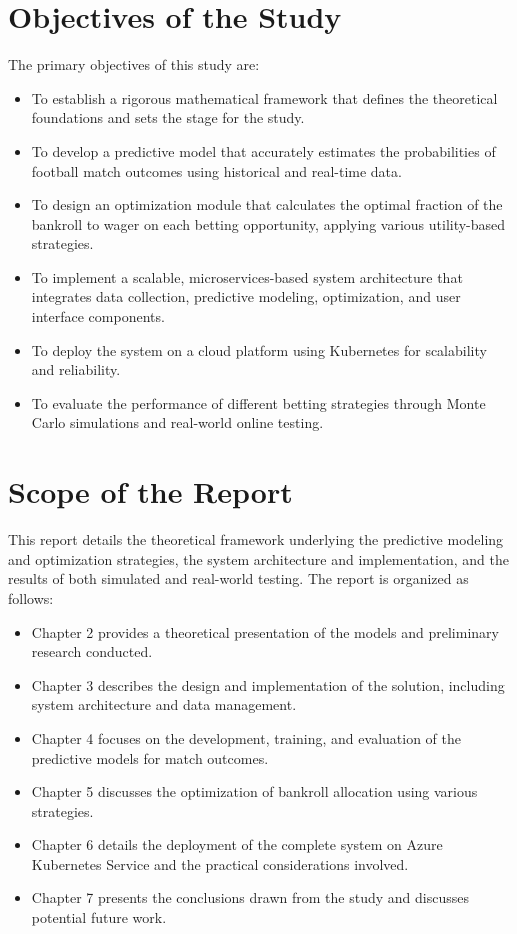 \documentclass[10pt]{report}
\begin{document}
\section{Objectives of the Study}

The primary objectives of this study are:

\begin{itemize}
\item To establish a rigorous mathematical framework that defines the theoretical foundations and sets the stage for the study.
\item To develop a predictive model that accurately estimates the probabilities of football match outcomes using historical and real-time data. \item To design an optimization module that calculates the optimal fraction of the bankroll to wager on each betting opportunity, applying various utility-based strategies. \item To implement a scalable, microservices-based system architecture that integrates data collection, predictive modeling, optimization, and user interface components. \item To deploy the system on a cloud platform using Kubernetes for scalability and reliability. \item To evaluate the performance of different betting strategies through Monte Carlo simulations and real-world online testing. \end{itemize}

\section{Scope of the Report}

This report details the theoretical framework underlying the predictive modeling and optimization strategies, the system architecture and implementation, and the results of both simulated and real-world testing. The report is organized as follows:

\begin{itemize} \item Chapter 2 provides a theoretical presentation of the models and preliminary research conducted. \item Chapter 3 describes the design and implementation of the solution, including system architecture and data management. \item Chapter 4 focuses on the development, training, and evaluation of the predictive models for match outcomes. \item Chapter 5 discusses the optimization of bankroll allocation using various strategies. \item Chapter 6 details the deployment of the complete system on Azure Kubernetes Service and the practical considerations involved. \item Chapter 7 presents the conclusions drawn from the study and discusses potential future work. \end{itemize}
\end{document}
